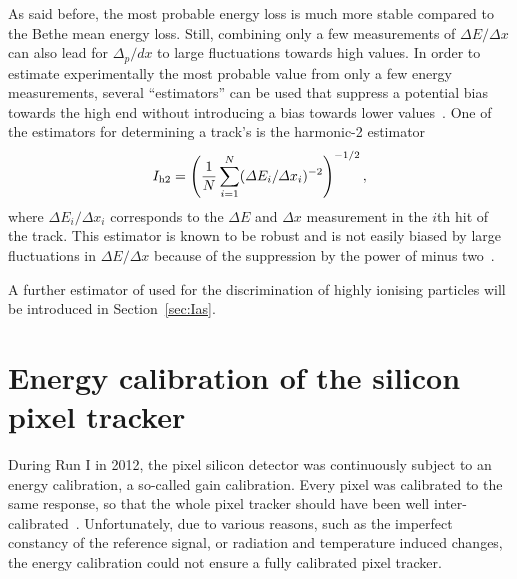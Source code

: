 As said before, the most probable energy loss is much more stable compared to the Bethe mean energy loss.
Still, combining only a few measurements of $\Delta E/\Delta x$ can also lead for $\Delta_p/dx$ to large fluctuations towards high \dedx values.
In order to estimate experimentally the most probable \dedx value from only a few energy measurements, several ``estimators'' can be used that suppress a potential bias towards the high end without introducing a bias towards lower values~\cite{bib:Quertenmont_2010}.
One of the estimators for determining a track's \dedx is the harmonic-2 estimator
\begin{equation}
I_{\text{h2}}=\left( \frac{1}{N}\sum_{i=1}^{N}(\Delta E_i/\Delta x_i)^{-2} \right)^{-1/2},
\label{eq:Harmonic2Estimator}
\end{equation}
where $\Delta E_i /\Delta x_i$ corresponds to the $\Delta E$ and $\Delta x$ measurement in the $i$th hit of the track. 
This estimator is known to be robust and is not easily biased by large fluctuations in  $\Delta E/\Delta x$ because of the suppression by the power of minus two~\cite{bib:Quertenmont_2010}.

A further estimator of \dedx used for the discrimination of highly ionising particles will be introduced in Section~\ref{sec:Ias}.


\FloatBarrier
\section{Energy calibration of the silicon pixel tracker}
\label{sec:EnergyCalibration}
During Run I in 2012, the pixel silicon detector was continuously subject to an energy calibration, a so-called gain calibration.
Every pixel was calibrated to the same response, so that the whole pixel tracker should have been well inter-calibrated~\cite{bib:Danek}.
Unfortunately, due to various reasons, such as the imperfect constancy of the reference signal, or radiation and temperature induced changes, the energy calibration could not ensure a fully calibrated pixel tracker.

